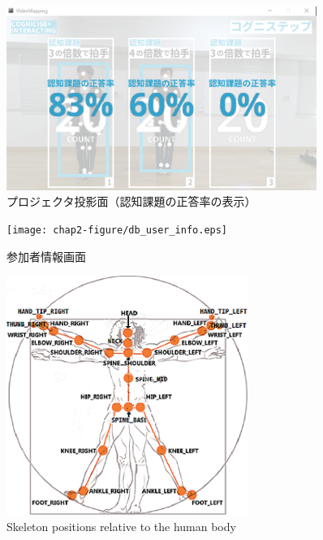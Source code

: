\begin{figure}[tbp]
	\centering
			\includegraphics[width=0.9\textwidth]{chap2-figure/vm_answer_rate.eps}
	\caption{プロジェクタ投影面（認知課題の正答率の表示）}
	\label{fig:vm_answer_rate}
\end{figure}

\begin{figure}[tbp]
	\centering
			\texttt{[image: chap2-figure/db\_user\_info.eps]}
	\caption{参加者情報画面}
	\label{fig:db_user_info}
\end{figure}

\begin{figure}[tbp]
	\centering
			\includegraphics[width=0.7\textwidth]{chap2-figure/skelton_position.eps}
	\caption{Skeleton positions relative to the human body}
	\label{fig:skelton_position}
\end{figure}

